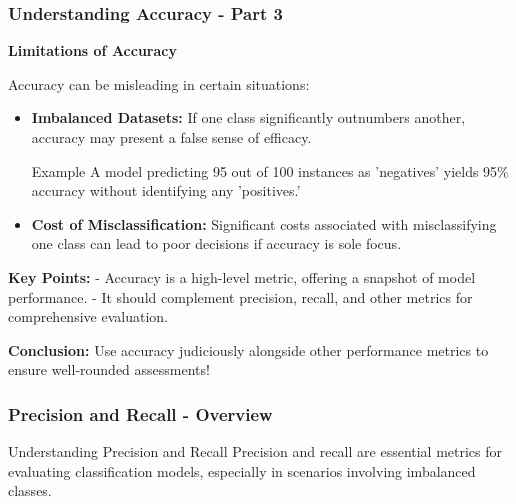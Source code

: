 \documentclass[aspectratio=169]{beamer}
\begin{document}
\begin{frame}[fragile]
    \frametitle{Understanding Accuracy - Part 3}
    \textbf{Limitations of Accuracy}
    
    Accuracy can be misleading in certain situations:

    \begin{itemize}
        \item \textbf{Imbalanced Datasets:} If one class significantly outnumbers another, accuracy may present a false sense of efficacy. 
        \begin{block}{Example}
            A model predicting 95 out of 100 instances as 'negatives' yields 95\% accuracy without identifying any 'positives.'
        \end{block}
        \item \textbf{Cost of Misclassification:} Significant costs associated with misclassifying one class can lead to poor decisions if accuracy is sole focus.
    \end{itemize}
    
    \textbf{Key Points:}
    - Accuracy is a high-level metric, offering a snapshot of model performance.
    - It should complement precision, recall, and other metrics for comprehensive evaluation.
    
    \textbf{Conclusion:} Use accuracy judiciously alongside other performance metrics to ensure well-rounded assessments! 
\end{frame}

\begin{frame}[fragile]
    \frametitle{Precision and Recall - Overview}
    \begin{block}{Understanding Precision and Recall}
        Precision and recall are essential metrics for evaluating classification models, especially in scenarios involving imbalanced classes.
    \end{block}
\end{frame}
\end{document}
